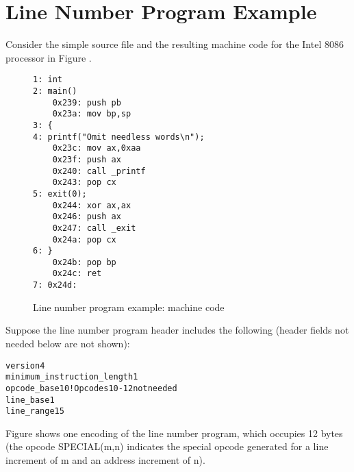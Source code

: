 \section{Line Number Program Example}
\label{app:linenumberprogramexample}

Consider the simple source file and the resulting machine
code for the Intel 8086 processor in 
Figure .

\begin{figure}[here]
\begin{lstlisting}
1: int
2: main()
    0x239: push pb
    0x23a: mov bp,sp
3: {
4: printf("Omit needless words\n");
    0x23c: mov ax,0xaa
    0x23f: push ax
    0x240: call _printf
    0x243: pop cx
5: exit(0);
    0x244: xor ax,ax
    0x246: push ax
    0x247: call _exit
    0x24a: pop cx
6: }
    0x24b: pop bp
    0x24c: ret
7: 0x24d:
\end{lstlisting}
\caption{Line number program example: machine code} \label{fig:linenumberprogramexamplemachinecode}
\end{figure}

Suppose the line number program header includes the following
(header fields not needed below are not shown):



\begin{alltt}
version                    4
minimum_instruction_length 1
opcode_base               10 ! Opcodes 10-12 not needed
line_base                  1
line_range                15
\end{alltt}


Figure 
shows one encoding of the line number program, which occupies
12 bytes (the opcode SPECIAL(m,n) indicates the special opcode
generated for a line increment of m and an address increment
of n).


